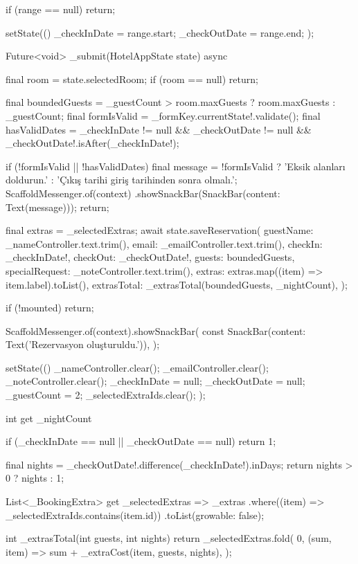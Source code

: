 \documentclass[11pt,a4paper]{article}
\begin{document}
\begin{codeblock}
{{    if (range == null) {
      return;
    }

    setState(() {
      _checkInDate = range.start;
      _checkOutDate = range.end;
    });
  }

  Future<void> _submit(HotelAppState state) async {
    final room = state.selectedRoom;
    if (room == null) {
      return;
    }

    final boundedGuests =
        _guestCount > room.maxGuests ? room.maxGuests : _guestCount;
    final formIsValid = _formKey.currentState!.validate();
    final hasValidDates = _checkInDate != null &&
        _checkOutDate != null &&
        _checkOutDate!.isAfter(_checkInDate!);

    if (!formIsValid || !hasValidDates) {
      final message = !formIsValid
          ? 'Eksik alanları doldurun.'
          : 'Çıkış tarihi giriş tarihinden sonra olmalı.';
      ScaffoldMessenger.of(context)
          .showSnackBar(SnackBar(content: Text(message)));
      return;
    }

    final extras = _selectedExtras;
    await state.saveReservation(
      guestName: _nameController.text.trim(),
      email: _emailController.text.trim(),
      checkIn: _checkInDate!,
      checkOut: _checkOutDate!,
      guests: boundedGuests,
      specialRequest: _noteController.text.trim(),
      extras: extras.map((item) => item.label).toList(),
      extrasTotal: _extrasTotal(boundedGuests, _nightCount),
    );

    if (!mounted) {
      return;
    }

    ScaffoldMessenger.of(context).showSnackBar(
      const SnackBar(content: Text('Rezervasyon oluşturuldu.')),
    );

    setState(() {
      _nameController.clear();
      _emailController.clear();
      _noteController.clear();
      _checkInDate = null;
      _checkOutDate = null;
      _guestCount = 2;
      _selectedExtraIds.clear();
    });
  }

  int get _nightCount {
    if (_checkInDate == null || _checkOutDate == null) {
      return 1;
    }

    final nights = _checkOutDate!.difference(_checkInDate!).inDays;
    return nights > 0 ? nights : 1;
  }

  List<_BookingExtra> get _selectedExtras => _extras
      .where((item) => _selectedExtraIds.contains(item.id))
      .toList(growable: false);

  int _extrasTotal(int guests, int nights) {
    return _selectedExtras.fold(
      0,
      (sum, item) => sum + _extraCost(item, guests, nights),
    );
  }

}
\end{codeblock}
\end{document}
